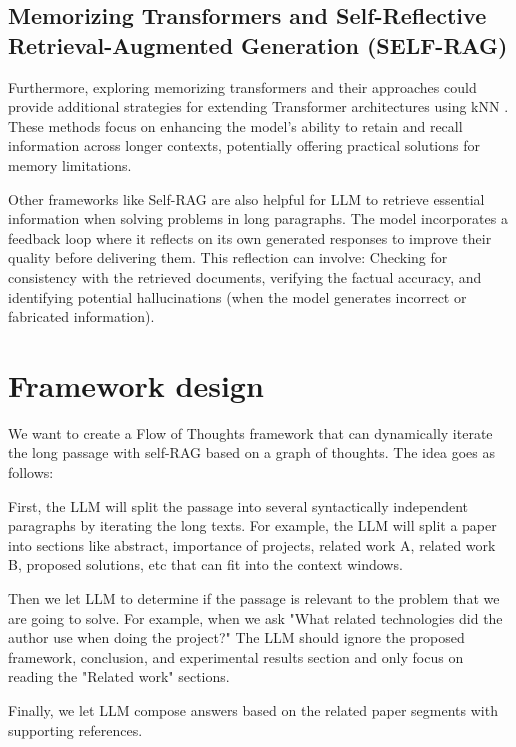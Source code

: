 \documentclass{article}
\begin{document}
\subsection{Memorizing Transformers and Self-Reflective Retrieval-Augmented Generation (SELF-RAG)}

Furthermore, exploring memorizing transformers and their approaches could provide additional strategies for extending Transformer architectures using kNN \cite{wu2022memorizingtransformers}. These methods focus on enhancing the model’s ability to retain and recall information across longer contexts, potentially offering practical solutions for memory limitations.

Other frameworks like Self-RAG \cite{asai2023selfraglearningretrievegenerate} are also helpful for LLM to retrieve essential information when solving problems in long paragraphs. The model incorporates a feedback loop where it reflects on its own generated responses to improve their quality before delivering them. This reflection can involve: Checking for consistency with the retrieved documents, verifying the factual accuracy, and identifying potential hallucinations (when the model generates incorrect or fabricated information).

\section{Framework design}

We want to create a Flow of Thoughts framework that can dynamically iterate the long passage with self-RAG based on a graph of thoughts. The idea goes as follows:

First, the LLM will split the passage into several syntactically independent paragraphs by iterating the long texts. For example, the LLM will split a paper into sections like abstract, importance of projects, related work A, related work B, proposed solutions, etc that can fit into the context windows.

Then we let LLM to determine if the passage is relevant to the problem that we are going to solve. For example, when we ask "What related technologies did the author use when doing the project?" The LLM should ignore the proposed framework, conclusion, and experimental results section and only focus on reading the "Related work" sections.

Finally, we let LLM compose answers based on the related paper segments with supporting references.
\end{document}
